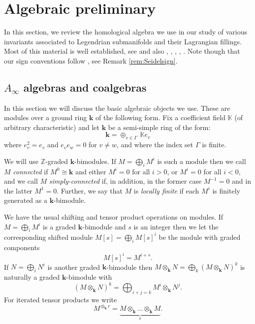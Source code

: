 \documentclass{gtpart}
\renewcommand{\k}{\mathbf{k}}
\renewcommand{\Z}{\mathbb{Z}}
\begin{document}
\section{Algebraic preliminary}
\label{algebra} 


In this section, we review the homological algebra we use in our study of various invariants
associated to Legendrian submanifolds and their Lagrangian fillings. Most of this material is well
established, see \cite{L-H} and also
\cite{proute}, \cite{Posit}, \cite{herscovich}, \cite{LV}, \cite{LPWZ}. Note though that our sign conventions follow \cite{seidelbook}, see Remark \ref{rem:Seidelsign}. 

\subsection{$A_\infty$ algebras and coalgebras}

In this section we will discuss the basic algebraic objects we use. These are modules over a ground ring $\k$ of the following form.  
Fix a coefficient field $\mathbb{K}$ (of arbitrary characteristic) and let $\k$ be a semi-simple ring of the form:
\[ 
\k = \oplus_{v\in\Gamma} \,\mathbb{K} e_v 
\]
where $e_v^2= e_v$ and $e_v e_w =0$ for $v \neq w$, and where the index set $\Gamma$ is finite.

We will use $\Z$-graded $\k$-bimodules. If $M= \bigoplus_i M^{i}$ is such a module then we call $M$ \emph{connected} if $M^0 \cong \k$ and
either $M^i =0$ for all $i>0$, or $M^{i}=0$ for all $i<0$, and we call $M$ \emph{simply-connected} if, in addition, in the former case $M^{-1}=0$ and in the latter $M^{1}=0$. Further, we say that $M$ is \emph{locally finite} if each $M^i$ is finitely generated as a $\k$-bimodule.  

We have the usual shifting and tensor product operations on modules. If $M = \bigoplus_{i} M^{i} $ is a graded $\k$-bimodule and $s$ is an integer then we let the corresponding shifted module $M[s]=\bigoplus_{i}M[s]^{i}$ be the module with graded components  
\[ 
M[s]^{i} = M^{i+s}. 
\]
If $N=\bigoplus_{i} N^{i}$ is another graded $\k$-bimodule then
$M\otimes_{\k}N=\bigoplus_{k}\left(M\otimes_{\k}N\right)^{k}$ is naturally a graded $\k$-bimodule with
\[ \left(M\otimes_{\k}N\right)^{k}=\bigoplus_{i+j=k}M^{i}\otimes_{\k} N^{j}.
\]
For iterated tensor products we write 
\[  
M^{\otimes_{\k}r}=\underbrace{M\otimes_{\k}\ldots \otimes_{\k} M}_{r}.
\]
\end{document}
